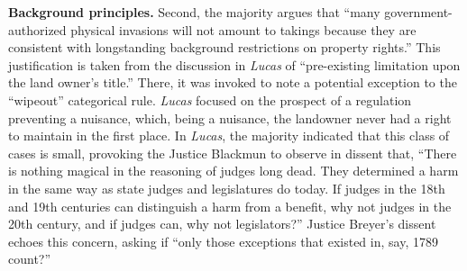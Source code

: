 
\item \textbf{Background principles.} Second, the majority argues that ``many
government-authorized physical invasions will not amount to takings because they
are consistent with longstanding background restrictions on property rights.''
This justification is taken from the discussion in \textit{Lucas} of
``pre-existing limitation upon the land owner's title.'' There, it was invoked
to note a potential exception to the ``wipeout'' categorical rule.
\textit{Lucas} focused on the prospect of a regulation preventing a nuisance,
which, being a nuisance, the landowner never had a right to maintain in the
first place. In \textit{Lucas}, the majority indicated that this class of cases
is small, provoking the Justice Blackmun to observe in dissent that, ``There is
nothing magical in the reasoning of judges long dead. They determined a harm in
the same way as state judges and legislatures do today. If judges in the 18th
and 19th centuries can distinguish a harm from a benefit, why not judges in the
20th century, and if judges can, why not legislators?'' Justice Breyer's dissent
echoes this concern, asking if ``only those exceptions that existed in, say,
1789 count?'' 

